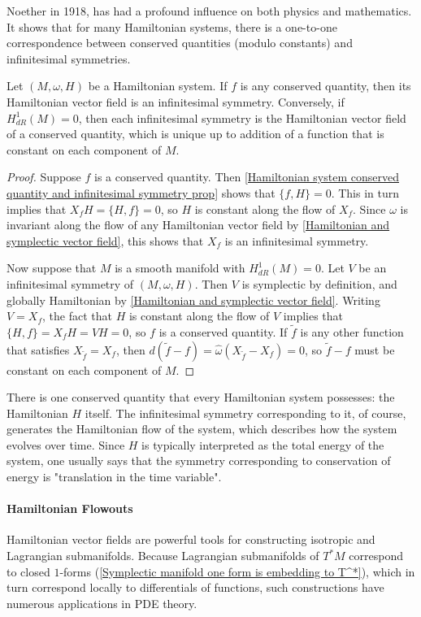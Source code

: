 Noether in 1918, has had a profound influence on both physics and mathematics. It shows that for many Hamiltonian systems, there is a one-to-one correspondence between conserved quantities (modulo constants) and infinitesimal symmetries.
\begin{theorem}
Let $(M,\omega,H)$ be a Hamiltonian system. If $f$ is any conserved quantity, then its Hamiltonian vector field is an infinitesimal symmetry. Conversely, if $H^1_{dR}(M)=0$, then each infinitesimal symmetry is the Hamiltonian vector field of a conserved quantity, which is unique up to addition of a function that is constant on each component of $M$.
\end{theorem}
\begin{proof}
Suppose $f$ is a conserved quantity. Then \cref{Hamiltonian system conserved quantity and infinitesimal symmetry prop} shows that $\{f,H\}=0$. This in turn implies that $X_fH=\{H,f\}=0$, so $H$ is constant along the flow of $X_f$. Since $\omega$ is invariant along the flow of any Hamiltonian vector field by \cref{Hamiltonian and symplectic vector field}, this shows that $X_f$ is an infinitesimal symmetry.\par
Now suppose that $M$ is a smooth manifold with $H^1_{dR}(M)=0$. Let $V$ be an infinitesimal symmetry of $(M,\omega,H)$. Then $V$ is symplectic by definition, and globally Hamiltonian by \cref{Hamiltonian and symplectic vector field}. Writing $V=X_f$, the fact that $H$ is constant along the flow of $V$ implies that $\{H,f\}=X_fH=VH=0$, so $f$ is a conserved quantity. If $\widetilde{f}$ is any other function that satisfies $X_{\widetilde{f}}=X_f$, then $d(\widetilde{f}-f)=\widehat{\omega}(X_{\widetilde{f}}-X_f)=0$, so $\widetilde{f}-f$ must be constant on each component of $M$.
\end{proof}

There is one conserved quantity that every Hamiltonian system possesses: the Hamiltonian $H$ itself. The infinitesimal symmetry corresponding to it, of course, generates the Hamiltonian flow of the system, which describes how the system evolves over time. Since $H$ is typically interpreted as the total energy of the system, one usually says that the symmetry corresponding to conservation of energy is "translation in the time variable".

\paragraph{Hamiltonian Flowouts}
Hamiltonian vector fields are powerful tools for constructing isotropic and Lagrangian submanifolds. Because Lagrangian submanifolds of $T^*M$ correspond to closed $1$-forms (\cref{Symplectic manifold one form is embedding to T^*}), which in turn correspond locally to differentials of functions, such constructions have numerous applications in PDE theory.

